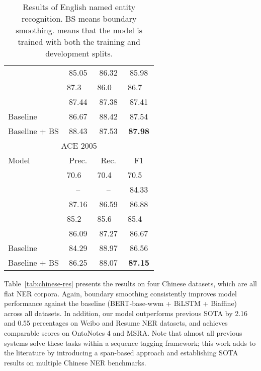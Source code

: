 \documentclass[11pt]{article}
\begin{document}
\begin{table}[!ht]
\begin{tabular}{lccc}
        \citet{li-etal-2020-unified}        & 85.05 & 86.32 & 85.98 \\
        \citet{yu-etal-2020-named}          & 87.3~~ & 86.0~~ & 86.7~~ \\
        \citet{shen-etal-2021-locate}       & 87.44 & 87.38 & 87.41 \\
        Baseline          & 86.67 & 88.42 & 87.54 \\
        Baseline + BS     & 88.43 & 87.53 & \textbf{87.98} \\
        \bottomrule
        \toprule
        \multicolumn{4}{c}{ACE 2005} \\
        \midrule
        Model & Prec. & Rec. & F1 \\
        \midrule
        \citet{katiyar-cardie-2018-nested}  & 70.6~~ & 70.4~~ & 70.5~~ \\
        \citet{strakova-etal-2019-neural} & -- & -- & 84.33 \\
        \citet{li-etal-2020-unified}        & 87.16 & 86.59 & 86.88 \\
        \citet{yu-etal-2020-named}          & 85.2~~ & 85.6~~ & 85.4~~ \\
        \citet{shen-etal-2021-locate}       & 86.09 & 87.27 & 86.67 \\
        Baseline          & 84.29 & 88.97 & 86.56 \\
        Baseline + BS     & 86.25 & 88.07 & \textbf{87.15} \\
        \bottomrule
    \end{tabular}
    \caption{Results of English named entity recognition. BS means boundary smoothing.  means that the model is trained with both the training and development splits.}
    \label{tab:english-res}
\end{table}


Table~\ref{tab:chinese-res} presents the results on four Chinese datasets, which are all flat NER corpora. Again, boundary smoothing consistently improves model performance against the baseline (BERT-base-wwm + BiLSTM + Biaffine) across all datasets. In addition, our model outperforms previous SOTA by 2.16 and 0.55 percentages on Weibo and Resume NER datasets, and achieves comparable  scores on OntoNotes 4 and MSRA. Note that almost all previous systems solve these tasks within a sequence tagging framework; this work adds to the literature by introducing a span-based approach and establishing SOTA results on multiple Chinese NER benchmarks. 
\end{document}
